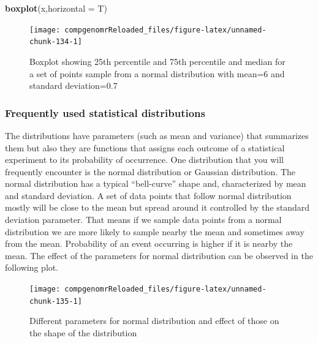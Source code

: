 \documentclass[12pt,]{krantz}
\newenvironment{Shaded}{\begin{snugshade}}{\end{snugshade}}
\newcommand{\DataTypeTok}[1]{\textcolor[rgb]{0.13,0.29,0.53}{#1}}
\newcommand{\KeywordTok}[1]{\textcolor[rgb]{0.13,0.29,0.53}{\textbf{#1}}}
\newcommand{\NormalTok}[1]{#1}
\begin{document}
\begin{Shaded}
\begin{Highlighting}[]
\KeywordTok{boxplot}\NormalTok{(x,}\DataTypeTok{horizontal =}\NormalTok{ T)}
\end{Highlighting}
\end{Shaded}

\begin{figure}

{\centering \texttt{[image: compgenomrReloaded\_files/figure-latex/unnamed-chunk-134-1]} 

}

\caption{Boxplot showing 25th percentile and 75th percentile and median for a set of points sample from a normal distribution with mean=6 and standard deviation=0.7}\label{fig:unnamed-chunk-134}
\end{figure}

\hypertarget{frequently-used-statistical-distributions}{%
\subsubsection{Frequently used statistical distributions}\label{frequently-used-statistical-distributions}}

The distributions have parameters (such as mean and variance) that
summarizes them but also they are functions that assigns each outcome of a
statistical experiment to its probability of occurrence.
One distribution that you
will frequently encounter is the normal distribution or Gaussian distribution.
The normal distribution has a typical ``bell-curve'' shape
and, characterized by mean and standard deviation. A set of data points
that
follow normal distribution mostly will be close to the mean
but spread around it controlled by the standard deviation parameter. That
means if we sample data points from a normal distribution we are more
likely to sample nearby the mean and sometimes away from the mean.
Probability of an event occurring is higher if it is nearby the mean.
The effect
of the parameters for normal distribution can be observed in the following
plot.

\begin{figure}

{\centering \texttt{[image: compgenomrReloaded\_files/figure-latex/unnamed-chunk-135-1]} 

}

\caption{Different parameters for normal distribution and effect of those on the shape of the distribution}\label{fig:unnamed-chunk-135}
\end{figure}
\end{document}
